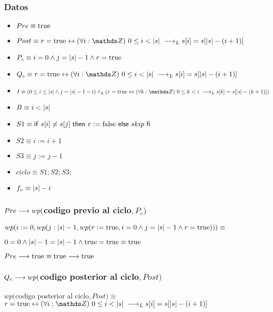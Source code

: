 \documentclass{article}
\begin{document}
\subsubsection*{Datos}
\begin{itemize}
    \item $Pre      \equiv \mathrm{true}$
    \item $Post     \equiv r = \True \Iff \paraTodo{i}{0}{\longitud{s}} \implicaLuego s[i]=s[\longitud{s}-(i+1)]$
    \item $P_{c}    \equiv i = 0 \wedge j = |s|-1 \wedge r = \mathrm{true}$
    \item $Q_{c}    \equiv r = \True \Iff \paraTodo{i}{0}{\longitud{s}} \implicaLuego s[i]=s[\longitud{s}-(i+1)]$
    \item $I        \equiv (0 \leq i \leq \longitud{s} \wedge j = \longitud{s}-1-i) \yLuego (r = \True \Iff \paraTodo{k}{0}{i} \implicaLuego s[k]=s[\longitud{s}-(k+1)])$
    \item $B        \equiv i < |s|$
    \item $S1       \equiv \mathsf{if}\ s[i] \neq s[j]\ \mathsf{then}\ r:=\mathrm{false}\ \mathsf{else}\ skip\ \mathsf{fi}$
    \item $S2       \equiv i:= i + 1$
    \item $S3       \equiv j:= j - 1$
    \item $ciclo    \equiv S1;S2;S3;$
    \item $f_{v}    \equiv |s| - i$
\end{itemize}

\subsubsection*{$Pre \longrightarrow wp($codigo previo al ciclo$, P_{c})$}

$wp(i:=0, wp(j:|s|-1, wp(r:= \mathrm{true}, i = 0 \wedge j = |s|-1 \wedge r = \mathrm{true}))) \equiv$

$ 0 = 0 \wedge |s| - 1 = |s| -1 \wedge \mathrm{true} = \mathrm{true} \equiv \mathrm{true}$

$ Pre \longrightarrow \mathrm{true} \equiv \mathrm{true} \longrightarrow \mathrm{true} $

\subsubsection*{$Q_{c} \longrightarrow wp($codigo posterior al ciclo$, Post)$}

$wp($codigo posterior al ciclo$, Post) \equiv$ \\

$r = \True \Iff \paraTodo{i}{0}{\longitud{s}} \implicaLuego s[i]=s[\longitud{s}-(i+1)]$
\end{document}

